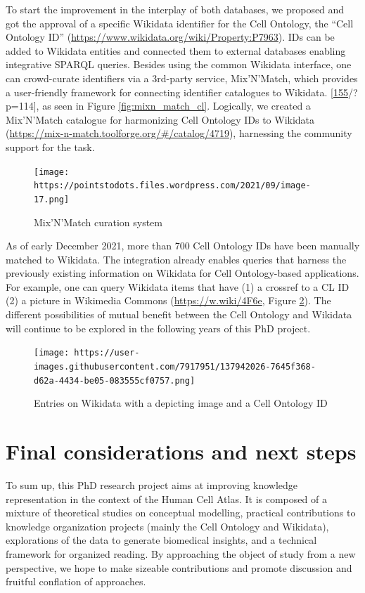 To start the improvement in the interplay of both databases, we proposed and got the approval of a specific Wikidata identifier for the Cell Ontology, the ``Cell Ontology ID'' (\url{https://www.wikidata.org/wiki/Property:P7963}).
IDs can be added to Wikidata entities and connected them to external databases enabling integrative SPARQL queries.
Besides using the common Wikidata interface, one can crowd-curate identifiers via a 3rd-party service, Mix'N'Match, which provides a user-friendly framework for connecting identifier catalogues to Wikidata. {[}\protect\hyperlink{ref-JgiKEEdq}{155}/?p=114{]}, as seen in Figure \ref{fig:mixn_match_cl}.
Logically, we created a Mix'N'Match catalogue for harmonizing Cell Ontology IDs to Wikidata (\url{https://mix-n-match.toolforge.org/\#/catalog/4719}), harnessing the community support for the task.

\begin{figure}
\hypertarget{fig:mixnmatch_cl}{%
\centering
\texttt{[image: https://pointstodots.files.wordpress.com/2021/09/image-17.png]}
\caption{Mix'N'Match curation system}\label{fig:mixnmatch_cl}
}
\end{figure}

As of early December 2021, more than 700 Cell Ontology IDs have been manually matched to Wikidata.
The integration already enables queries that harness the previously existing information on Wikidata for Cell Ontology-based applications.
For example, one can query Wikidata items that have (1) a crossref to a CL ID (2) a picture in Wikimedia Commons (\url{https://w.wiki/4F6e}, Figure \ref{fig:cl_images}).
The different possibilities of mutual benefit between the Cell Ontology and Wikidata will continue to be explored in the following years of this PhD project.

\begin{figure}
\hypertarget{fig:cl_images}{%
\centering
\texttt{[image: https://user-images.githubusercontent.com/7917951/137942026-7645f368-d62a-4434-be05-083555cf0757.png]}
\caption{Entries on Wikidata with a depicting image and a Cell Ontology ID}\label{fig:cl_images}
}
\end{figure}

\hypertarget{final-considerations-and-next-steps}{%
\section{Final considerations and next steps}\label{final-considerations-and-next-steps}}

To sum up, this PhD research project aims at improving knowledge representation in the context of the Human Cell Atlas.
It is composed of a mixture of theoretical studies on conceptual modelling, practical contributions to knowledge organization projects (mainly the Cell Ontology and Wikidata), explorations of the data to generate biomedical insights, and a technical framework for organized reading.
By approaching the object of study from a new perspective, we hope to make sizeable contributions and promote discussion and fruitful conflation of approaches.

